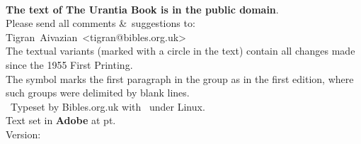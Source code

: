 \begin{center}
\\
\parbox{0.9\linewidth}{\centering
\textbf{The text of The Urantia Book is in the public domain}.\\[5pt]
Please send all comments \&\ suggestions to: {\makeatletter Tigran~Aivazian~<tigran@bibles.org.uk>\makeatother}\\[1pt]
The textual variants (marked with a circle in the text) contain all changes made since the 1955 First Printing.\\
The symbol \pc{} marks the first paragraph in the group as in the first edition, where such groups were delimited by blank lines.\\
\tux\ Typeset by Bibles.org.uk with \XeLaTeX\ under Linux.\\
Text set in \textbf{Adobe \urantiamainfont} at \urantiamainfontsize pt.\\[18pt]
\upshape\normalsize{} Version: \mytoday{}\\
}
\end{center}

\titleframe
